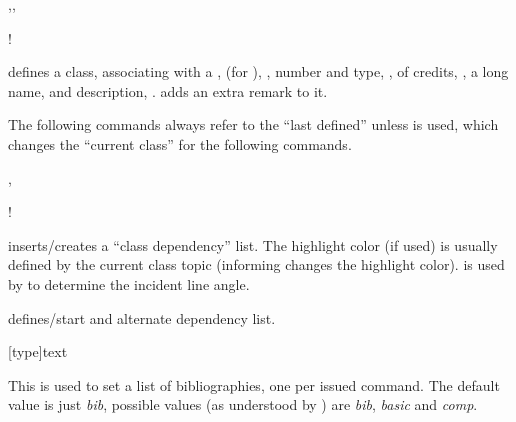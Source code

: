 \documentclass[dctools,english,tocdepth=3,secdepth=3]{ufrgscca} %
\begin{document}
\begin{Macros}{\classdef,\setclass,\classremark}
    \begin{Syntax}%
        \Macro!{\classdef}{}
    \end{Syntax}
\Macro{\classdef}{} defines a class, associating with a ,  (for ), , number and type, , of credits, , a long name,  and description, . \Macro{\classremark}{} adds an extra remark to it.

The following commands always refer to the “last defined” \Macro{\classdef}{} unless \Macro{\setclass}{} is used, which changes the “current class” for the following commands.
\end{Macros}

\begin{Macros}{\depdef,\altdef}
    \begin{Syntax}%
        \Macro!{\depdef}{}
        \Macro{\altdef}{}
    \end{Syntax}
\Macro{\depdef}{} inserts/creates a “class dependency” list. The highlight color (if used) is usually defined by the current class topic (informing  changes the highlight color).  is used by  to determine the incident line angle.

\Macro{\altdef}{} defines/start and alternate dependency list.
\end{Macros}

\begin{Macros}{\bibdef}
    \begin{Syntax}%
        \Macro{\bibdef}[type]{text}
    \end{Syntax}
This is used to set a list of bibliographies, one per issued command. The default  value is just \emph{bib}, possible values (as understood by ) are \emph{bib}, \emph{basic} and \emph{comp}.
\end{Macros}
\end{document}
